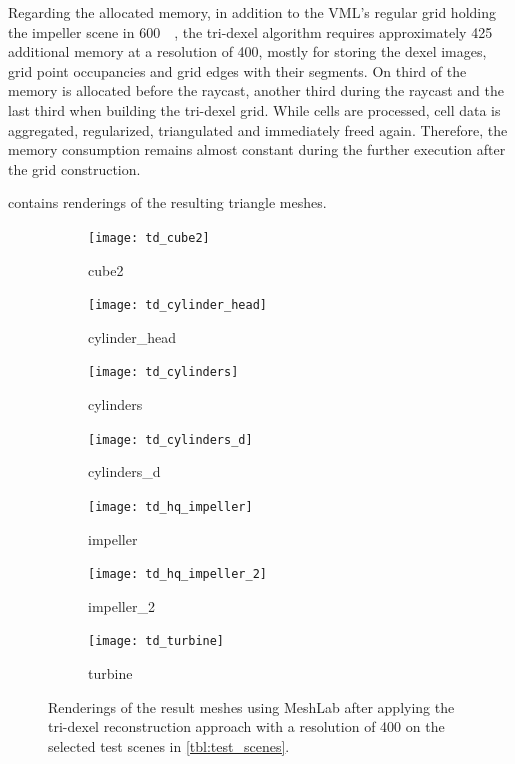 Regarding the allocated memory, in addition to the VML's regular grid holding the impeller scene in \SI{600}{\mebi\byte}, the tri-dexel algorithm requires approximately \SI{425}{\mebi\byte} additional memory at a resolution of 400, mostly for storing the dexel images, grid point occupancies and grid edges with their segments.
On third of the memory is allocated before the raycast, another third during the raycast and the last third when building the tri-dexel grid.
While cells are processed, cell data is aggregated, regularized, triangulated and immediately freed again.
Therefore, the memory consumption remains almost constant during the further execution after the grid construction.

 contains renderings of the resulting triangle meshes.
%
\begin{figure}
	\centering
	\begin{subfigure}[b]{0.34\textwidth}
		\centering
		\texttt{[image: td\_cube2]}
		\caption{cube2}
		\label{fig:td_cube2}
	\end{subfigure}
	\hspace{1cm}
	\begin{subfigure}[b]{0.34\textwidth}
		\centering
		\texttt{[image: td\_cylinder\_head]}
		\caption{cylinder\_head}
		\label{fig:td_cylinder_head}
	\end{subfigure}
	\begin{subfigure}[b]{0.34\textwidth}
		\centering
		\texttt{[image: td\_cylinders]}
		\caption{cylinders}
		\label{fig:td_cylinders}
	\end{subfigure}
	\hspace{1cm}
	\begin{subfigure}[b]{0.34\textwidth}
		\centering
		\texttt{[image: td\_cylinders\_d]}
		\caption{cylinders\_d}
		\label{fig:td_cylinders_delaunay}
	\end{subfigure}
	\begin{subfigure}[b]{0.34\textwidth}
		\centering
		\texttt{[image: td\_hq\_impeller]}
		\caption{impeller}
		\label{fig:td_hq_impeller}
	\end{subfigure}
	\hspace{1cm}
	\begin{subfigure}[b]{0.34\textwidth}
		\centering
		\texttt{[image: td\_hq\_impeller\_2]}
		\caption{impeller\_2}
		\label{fig:td_hq_impeller_2}
	\end{subfigure}
	\begin{subfigure}[b]{0.33\textwidth}
		\centering
		\texttt{[image: td\_turbine]}
		\caption{turbine}
		\label{fig:td_turbine}
	\end{subfigure}
	\caption{
		Renderings of the result meshes using MeshLab after applying the tri-dexel reconstruction approach with a resolution of 400 on the selected test scenes in \cref{tbl:test_scenes}.
	}
	\label{fig:td_results}
\end{figure}
